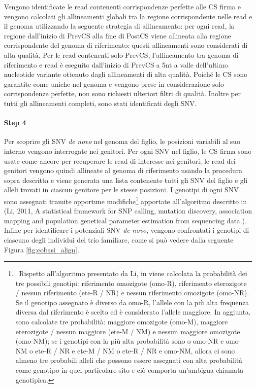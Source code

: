 \documentclass[../main.tex]{subfiles}
\begin{document}
Vengono identificate le read contenenti corrispondenze perfette alle CS firma e vengono calcolati gli allineamenti globali tra la regione corrispondente nelle read e il genoma utilizzando la seguente strategia di allineamento: per ogni read, la regione dall'inizio di PrevCS alla fine di PostCS viene allineata alla regione corrispondente del genoma di riferimento: questi allineamenti sono considerati di alta qualità. Per le read contenenti solo PrevCS, l'allineamento tra genoma di riferimento e read è eseguito dall'inizio di PrevCS a 5nt a valle dell'ultimo nucleotide variante ottenuto dagli allineamenti di alta qualità. Poiché le CS sono garantite come uniche nel genoma e vengono prese in considerazione solo corrispondenze perfette, non sono richiesti ulteriori filtri di qualità. Inoltre per tutti gli allineamenti completi, sono stati identificati degli SNV.

\paragraph{Step 4} Per scoprire gli SNV \textit{de novo} nel genoma del figlio, le posizioni variabili al suo interno vengono interrogate nei genitori. Per ogni SNV nel figlio, le CS firma sono usate come ancore per recuperare le read di interesse nei genitori; le read dei genitori vengono quindi allineate al genoma di riferimento usando la procedura sopra descritta e viene generata una lista contenente tutti gli SNV del figlio e gli alleli trovati in ciascun genitore per le stesse posizioni. I genotipi di ogni SNV sono assegnati tramite opportune modifiche\footnote{\ Rispetto all'algoritmo presentato da Li, in \cite{gomez-romero2018cobasi} viene calcolata la probabilità dei tre possibili genotipi: riferimento omozigote (omo-R), riferimento eterozigote / nessun riferimento (ete-R / NR) e nessun riferimento omozigote (omo-NR). Se il genotipo assegnato è diverso da omo-R, l'allele con la più alta frequenza diversa dal riferimento è scelto ed è considerato l'allele maggiore. In aggiunta, sono calcolate tre probabilità: maggiore omozigote (omo-M), maggiore eterozigote / nessun maggiore (ete-M / NM) e nessun maggiore omozigote (omo-NM); se i genotipi con la più alta probabilità sono o omo-NR e omo-NM o ete-R / NR e ete-M / NM o ete-R / NR e omo-NM, allora ci sono almeno tre probabili alleli che possono essere assegnati con alta probabilità come genotipo in quel particolare sito e ciò comporta un'ambigua chiamata genotipica.} apportate all'algoritmo descritto in (Li, 2011, A statistical framework for SNP calling, mutation discovery, association mapping and population genetical parameter estimation from sequencing data.). Infine per identificare i potenziali SNV \textit{de novo}, vengono confrontati i genotipi di ciascuno degli individui del trio familiare, come si può vedere dalla seguente Figura \ref{fig:cobasi_align}.
\end{document}
